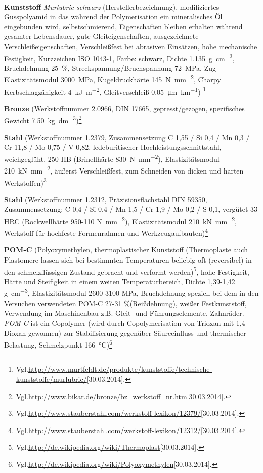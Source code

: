 \documentclass[12pt,a4paper,parskip]{scrartcl}
\begin{document}
\begin{itemize*}
\item \textbf{Kunststoff} \emph{Murlubric\textsuperscript{\textregistered} schwarz} (Herstellerbezeichnung), modifiziertes Gusspolyamid in das während der Polymerisation ein mineralisches Öl eingebunden wird, selbstschmierend, Eigenschaften bleiben erhalten während gesamter Lebensdauer, gute Gleiteigenschaften, ausgezeichnete Verschleißeigenschaften, Verschleißfest bei abrasiven Einsätzen, hohe mechanische Festigkeit, Kurzzeichen ISO 1043-1, Farbe: schwarz, Dichte \SI{1,135}{\gram\per\centi\meter\cubed}, Bruchdehnung \SI{25}{\percent}, Streckspannung/Bruchspannung \SI{72}{\mega\pascal}, Zug-Elastizitätsmodul \SI{3000}{\mega\pascal}, Kugeldruckhärte \SI{145}{\newton\per\milli\meter\squared},  Charpy Kerbschlagzähigkeit
 \SI{4}{\kilo\joule\per\meter\squared}, Gleitverschleiß \SI{0,05}{\micro\meter\per\kilo\meter})
\footnote{Vgl.\url{http://www.murtfeldt.de/produkte/kunststoffe/technische-kunststoffe/murlubric/}[30.03.2014].}
\item \textbf{Bronze} (Werkstoffnummer 2.0966, DIN 17665, gepresst/gezogen, spezifisches Gewicht \SI{7.50}{\kilo\gram\per\deci\meter\cubed})\footnote{Vgl.\url{http://www.bikar.de/bronze/bz_werkstoff_nr.htm}[30.03.2014].}
\item \textbf{Stahl} (Werkstoffnummer 1.2379, Zusammensetzung C 1,55 / Si 0,4 / Mn 0,3 / Cr 11,8 / Mo 0,75 / V 0,82, ledeburitischer Hochleistungsschnittstahl,  weichgeglüht, 250 HB (Brinellhärte \SI{830}{\newton\per\milli\meter\squared}), Elastizitätsmodul  \SI{210}{\kilo\newton\per\milli\meter\squared}, äußerst Verschleißfest, zum Schneiden von dicken und harten Werkstoffen)\footnote{Vgl.\url{http://www.stauberstahl.com/werkstoff-lexikon/12379/}[30.03.2014].}
\item \textbf{Stahl} (Werkstoffnummer 1.2312, Präzisionsflachstahl DIN 59350, Zusammensetzung: C 0,4 / Si 0,4 / Mn 1,5 / Cr 1,9 / Mo 0,2 / S 0,1, vergütet 33 HRC (Rockwellhärte 950-110 \si{\newton\per\milli\meter\squared}), Elastizitätsmodul \SI{210}{\kilo\newton\per\milli\meter\squared}, Werkstoff für hochfeste Formenrahmen und Werkzeugaufbauten)\footnote{Vgl.\url{http://www.stauberstahl.com/werkstoff-lexikon/12312/}[30.03.2014].}
\item \textbf{POM-C} (Polyoxymethylen, thermoplastischer Kunststoff (Thermoplaste auch Plastomere lassen sich bei bestimmten Temperaturen beliebig oft (reversibel) in den schmelzflüssigen Zustand gebracht und verformt werden)\footnote{Vgl.\url{http://de.wikipedia.org/wiki/Thermoplast}[30.03.2014].},  hohe Festigkeit,  Härte und Steifigkeit in einem weiten Temperaturbereich, Dichte 1,39-1,42 \si{\gram\per\centi\meter\cubed}, Elastizitätsmodul 2600-3100 \si{\mega\pascal}, Bruchdehnung  speziell bei dem in den Versuchen verwendeten POM-C 27-31 \si{\percent}(Reißdehnung), weißer Festkunststoff, Verwendung im Maschinenbau z.B. Gleit- und Führungselemente, Zahnräder. \emph{POM-C} ist ein Copolymer (wird durch Copolymerisation von Trioxan mit 1,4 Dioxan gewonnen) zur Stabilisierung gegenüber Säureeinfluss und thermischer Belastung, Schmelzpunkt 
\SI{166}{\degreeCelsius})\footnote{Vgl.\url{http://de.wikipedia.org/wiki/Polyoxymethylen}[30.03.2014].}
\end{itemize*}
\newpage
\end{document}
